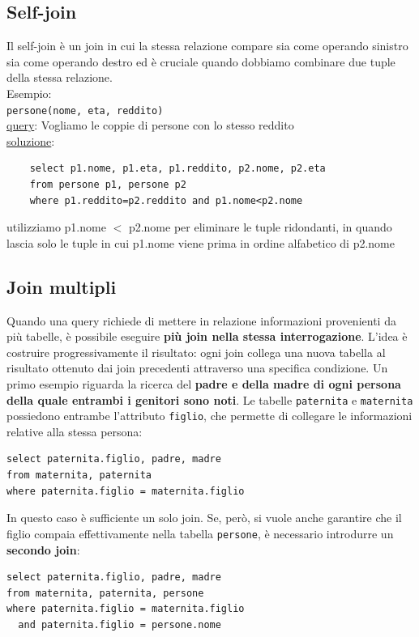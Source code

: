 \subsection{Self-join}
Il self-join è un join in cui la stessa relazione compare sia come operando sinistro sia come operando destro ed è cruciale quando dobbiamo combinare due tuple della stessa relazione.\\
\textcolor{verdeEsempio}{Esempio:}\\
\texttt{persone(nome, eta, reddito)}\\
\underline{query}: Vogliamo le coppie di persone con lo stesso reddito\\
\underline{soluzione}:
\begin{verbatim}
    select p1.nome, p1.eta, p1.reddito, p2.nome, p2.eta
    from persone p1, persone p2
    where p1.reddito=p2.reddito and p1.nome<p2.nome
\end{verbatim}
\noindent utilizziamo p1.nome $<$ p2.nome per eliminare le tuple ridondanti, in quando lascia solo le tuple in cui p1.nome viene prima in ordine alfabetico di p2.nome

\subsection{Join multipli}

Quando una query richiede di mettere in relazione informazioni provenienti da più tabelle, è possibile eseguire \textbf{più join nella stessa interrogazione}. L'idea è costruire progressivamente il risultato: ogni join collega una nuova tabella al risultato ottenuto dai join precedenti attraverso una specifica condizione.
Un primo esempio riguarda la ricerca del \textbf{padre e della madre di ogni persona della quale entrambi i genitori sono noti}. Le tabelle \texttt{paternita} e \texttt{maternita} possiedono entrambe l'attributo \texttt{figlio}, che permette di collegare le informazioni relative alla stessa persona:

\begin{verbatim}
select paternita.figlio, padre, madre
from maternita, paternita
where paternita.figlio = maternita.figlio
\end{verbatim}

\noindent In questo caso è sufficiente un solo join. Se, però, si vuole anche garantire che il figlio compaia effettivamente nella tabella \texttt{persone}, è necessario introdurre un \textbf{secondo join}:

\begin{verbatim}
select paternita.figlio, padre, madre
from maternita, paternita, persone
where paternita.figlio = maternita.figlio
  and paternita.figlio = persone.nome
\end{verbatim}

